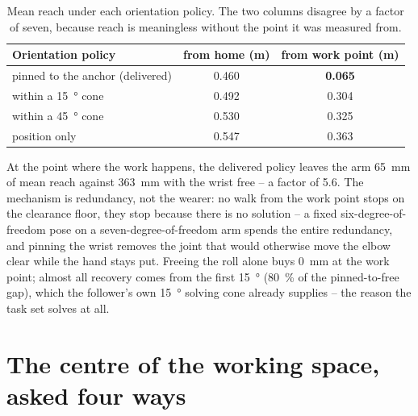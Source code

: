 \begin{table}[htbp]
  \centering
  \small
  \caption[Reach from home and from the work point]{Mean reach under each
  orientation policy. The two columns disagree by a factor of seven, because
  reach is meaningless without the point it was measured from.}
  \label{tab:work-point}
  \begin{tabular}{@{}lcc@{}}
    \toprule
    Orientation policy & from home (\si{\metre}) & from work point (\si{\metre}) \\
    \midrule
    pinned to the anchor (delivered) & \num{0.460} & \textbf{\num{0.065}} \\
    within a \SI{15}{\degree} cone   & \num{0.492} & \num{0.304} \\
    within a \SI{45}{\degree} cone   & \num{0.530} & \num{0.325} \\
    position only                    & \num{0.547} & \num{0.363} \\
    \bottomrule
  \end{tabular}
\end{table}

At the point where the work happens, the delivered policy leaves the arm
\SI{65}{\milli\metre} of mean reach against \SI{363}{\milli\metre} with the
wrist free -- a factor of \num{5.6}. The mechanism is redundancy, not the
wearer: no walk from the work point stops on the clearance floor, they stop
because there is no solution -- a fixed six-degree-of-freedom pose on a
seven-degree-of-freedom arm spends the entire redundancy, and pinning the
wrist removes the joint that would otherwise move the elbow clear while the
hand stays put. Freeing the roll alone buys \SI{0}{\milli\metre} at the work
point; almost all recovery comes from the first \SI{15}{\degree}
(\SI{80}{\percent} of the pinned-to-free gap), which the follower's own
\SI{15}{\degree} solving cone already supplies -- the reason the task set
solves at all.

\section{The centre of the working space, asked four ways}
\label{sec:centre}

